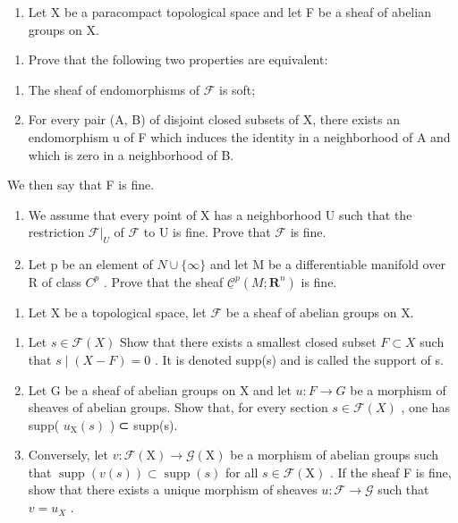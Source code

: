 \exercisegroup

\begin{enumerate}
\def\labelenumi{\arabic{enumi})}
\tightlist
\item
  Let X be a paracompact topological space and let F be a sheaf of abelian groups on X.
\end{enumerate}

\begin{enumerate}
\def\labelenumi{\alph{enumi})}
\tightlist
\item
  Prove that the following two properties are equivalent:
\end{enumerate}

\begin{enumerate}
\def\labelenumi{(\roman{enumi})}
\item
  The sheaf of endomorphisms of \(\mathcal{F}\) is soft;
\item
  For every pair (A, B) of disjoint closed subsets of X, there exists an endomorphism u of F which induces the identity in a neighborhood of A and which is zero in a neighborhood of B.
\end{enumerate}

We then say that F is fine.

\begin{enumerate}
\def\labelenumi{\alph{enumi})}
\setcounter{enumi}{1}
\item
  We assume that every point of X has a neighborhood U such that the restriction \(\mathcal{F}|_{U}\) of \(\mathcal{F}\) to U is fine. Prove that \(\mathcal{F}\) is fine.
\item
  Let p be an element of \(N \cup \{\infty\}\) and let M be a differentiable manifold over R of class \(C^{p}\) . Prove that the sheaf \(\underline{\mathcal{C}}^{p}(M; \mathbf{R}^{n})\) is fine.
\end{enumerate}

\begin{enumerate}
\def\labelenumi{\arabic{enumi})}
\setcounter{enumi}{1}
\tightlist
\item
  Let X be a topological space, let \(\mathcal{F}\) be a sheaf of abelian groups on X.
\end{enumerate}

\begin{enumerate}
\def\labelenumi{\alph{enumi})}
\item
  Let \(s \in \mathcal{F}(X)\) Show that there exists a smallest closed subset \(F \subset X\) such that \(s \mid (X - F) = 0\) . It is denoted supp(s) and is called the support of s.
\item
  Let G be a sheaf of abelian groups on X and let \(u: F \to G\) be a morphism of sheaves of abelian groups. Show that, for every section \(s \in \mathcal{F}(X)\) , one has supp( \(u_{\mathrm{X}}(s)\) ) ⊂ supp(s).
\item
  Conversely, let \(v\colon\mathcal{F}(\mathrm{X})\to\mathcal{G}(\mathrm{X})\) be a morphism of abelian groups such that \(\operatorname{supp}(v(s))\subset\operatorname{supp}(s)\) for all \(s\in\mathcal{F}(\mathrm{X})\) . If the sheaf F is fine, show that there exists a unique morphism of sheaves \(u\colon\mathcal{F}\to\mathcal{G}\) such that \(v=u_{X}\) .
\end{enumerate}

